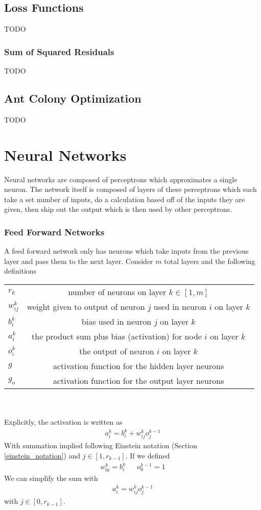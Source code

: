 \subsection{Loss Functions}
TODO
\subsubsection{Sum of Squared Residuals}
TODO

\subsection{Ant Colony Optimization}
TODO

\section{Neural Networks}
Neural networks are composed of perceptrons which approximates a single neuron. The network itself is composed of layers of these perceptrons which each take a set number of inputs, do a calculation based off of the inputs they are given, then ship out the output which is then used by other perceptrons.

\subsubsection{Feed Forward Networks}
A feed forward network only has neurons which take inputs from the previous layer and pass them to the next layer. Consider $m$ total layers and the following definitions \cite{brilliant_backpropagation}
\\
\begin{tabular}{ l c }
  $r_k$ & number of neurons on layer $k\in[1,m]$\\
  $w_{ij}^k$ & weight given to output of neuron $j$ used in neuron $i$ on layer $k$  \\
  $b_i^k$ & bias used in neuron $j$ on layer $k$   \\
  $a_i^k$ & the product sum plus bias (activation) for node $i$ on layer $k$  \\
  $o_i^k$ & the output of neuron $i$ on layer $k$ \\
  $g$ & activation function for the hidden layer neurons \\
  $g_o$ & activation function for the output layer neurons \\
\end{tabular}\\
\\
Explicitly, the activation is written as
\begin{align}
	a_i^k =b_i^k + w_{ij}^ko_j^{k-1}
\end{align}
With summation implied following Einstein notation (Section \ref{einstein_notation}) and $j\in [1,r_{k-1}]$. If we defined 
\begin{align}
	w^k_{0i}=b_i^k && o_0^{k-1}=1
\end{align}
We can simplify the sum with
\begin{align}\label{nn_activation}
	a_i^k = w_{ij}^ko_j^{k-1}
\end{align}
with $j\in [0,r_{k-1}]$.

